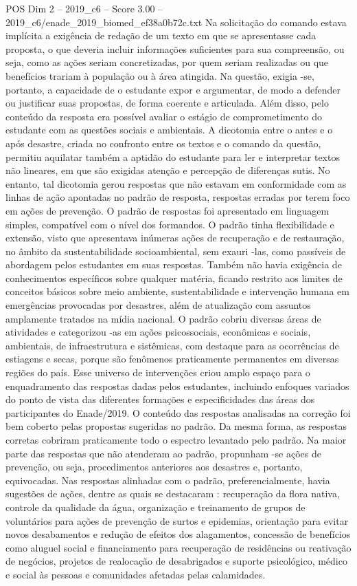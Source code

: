 \begin{textsample}{POS Dim 2 – 2019\_c6 – Score 3.00 – 2019\_c6/enade\_2019\_biomed\_ef38a0b72c.txt}
Na solicitação do comando estava implícita a exigência de redação de um texto em que se apresentasse cada proposta, o que deveria incluir informações suficientes para sua compreensão, ou seja, como as ações seriam concretizadas, por quem seriam realizadas ou que benefícios trariam à população ou à área atingida.
Na questão, exigia -se, portanto, a capacidade de o estudante expor e argumentar, de modo a defender ou justificar suas propostas, de forma coerente e articulada.
Além disso, pelo conteúdo da resposta era possível avaliar o estágio de comprometimento do estudante com as questões sociais e ambientais.
A dicotomia entre o antes e o após desastre, criada no confronto entre os textos e o comando da questão, permitiu aquilatar também a aptidão do estudante para ler e interpretar textos não lineares, em que são exigidas atenção e percepção de diferenças sutis.
No entanto, tal dicotomia gerou respostas que não estavam em conformidade com as linhas de ação apontadas no padrão de resposta, respostas erradas por terem foco em ações de prevenção.
O padrão de respostas foi apresentado em linguagem simples, compatível com o nível dos formandos.
O padrão tinha flexibilidade e extensão, visto que apresentava inúmeras ações de recuperação e de restauração, no âmbito da sustentabilidade socioambiental, sem exauri -las, como passíveis de abordagem pelos estudantes em suas respostas.
Também não havia exigência de conhecimentos específicos sobre qualquer matéria, ficando restrito aos limites de conceitos básicos sobre meio ambiente, sustentabilidade e intervenção humana em emergências provocadas por desastres, além de atualização com assuntos amplamente tratados na mídia nacional.
O padrão cobriu diversas áreas de atividades e categorizou -as em ações psicossociais, econômicas e sociais, ambientais, de infraestrutura e sistêmicas, com destaque para as ocorrências de estiagens e secas, porque são fenômenos praticamente permanentes em diversas regiões do país.
Esse universo de intervenções criou amplo espaço para o enquadramento das respostas dadas pelos estudantes, incluindo enfoques variados do ponto de vista das diferentes formações e especificidades das áreas dos participantes do Enade/2019.
O conteúdo das respostas analisadas na correção foi bem coberto pelas propostas sugeridas no padrão.
Da mesma forma, as respostas corretas cobriram praticamente todo o espectro levantado pelo padrão.
Na maior parte das respostas que não atenderam ao padrão, propunham -se ações de prevenção, ou seja, procedimentos anteriores aos desastres e, portanto, equivocadas.
Nas respostas alinhadas com o padrão, preferencialmente, havia sugestões de ações, dentre as quais se destacaram : recuperação da flora nativa, controle da qualidade da água, organização e treinamento de grupos de voluntários para ações de prevenção de surtos e epidemias, orientação para evitar novos desabamentos e redução de efeitos dos alagamentos, concessão de benefícios como aluguel social e financiamento para recuperação de residências ou reativação de negócios, projetos de realocação de desabrigados e suporte psicológico, médico e social às pessoas e comunidades afetadas pelas calamidades.

\end{textsample}
